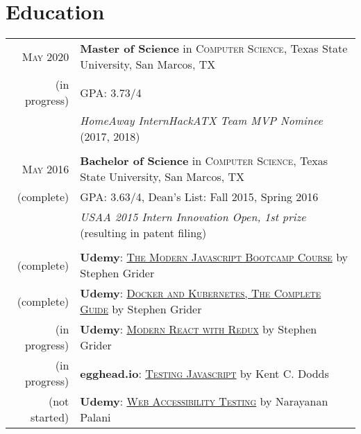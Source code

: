 \documentclass[a4paper,10pt]{article}
\begin{document}
\section{Education}
\begin{tabular}{rl}	
	\textsc{May} 2020 & \textbf{Master of Science} in \textsc{Computer Science}, Texas State University, San Marcos, TX\\
	
	(in progress) &\normalsize \textsc{GPA}: 3.73/4 \\ 
	
	& \emph{HomeAway InternHackATX Team MVP Nominee} (2017, 2018) \\
	
	& \\
	
	\textsc{May} 2016 & \textbf{Bachelor of Science} in \textsc{Computer Science}, Texas State University, San Marcos, TX \\
	
	(complete) &\normalsize \textsc{GPA}: 3.63/4,  Dean's List: Fall 2015, Spring 2016 \\
	
	& \emph{USAA 2015 Intern Innovation Open, 1st prize} (resulting in patent filing)  \\
	
	& \\
	
	(complete) & \textbf{Udemy}: \href {https://www.udemy.com/course/javascript-beginners-complete-tutorial/}{\textsc{The Modern Javascript Bootcamp Course}} by Stephen Grider \\
	
	(complete) & \textbf{Udemy}: \href {https://www.udemy.com/course/docker-and-kubernetes-the-complete-guide/}{\textsc{Docker and Kubernetes, The Complete Guide}} by Stephen Grider \\
	
	(in progress) & \textbf{Udemy}: \href {https://www.udemy.com/course/react-redux/}{\textsc{Modern React with Redux}} by Stephen Grider \\
	
	(in progress) & \textbf{egghead.io}: \href {https://testingjavascript.com/}{\textsc{Testing Javascript}} by Kent C. Dodds \\
	
	(not started) & \textbf{Udemy}: \href {https://www.udemy.com/course/webaccessibility/}{\textsc{Web Accessibility Testing}} by Narayanan Palani \\
	
	
\end{tabular}
\end{document}
